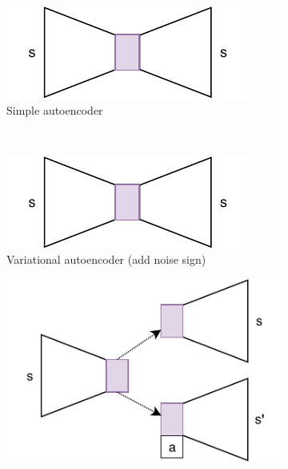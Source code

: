 \begin{figure}[ht!]
	\centering
	\begin{subfigure}{0.45\columnwidth}
		\centering
		\includegraphics[width=\linewidth]{img/very_simple_autoencoder.pdf}
		\caption{Simple autoencoder}
		\label{subfig:repr_learner_simple_autoencoder}
	\end{subfigure}%
	~ 
	\begin{subfigure}{0.45\columnwidth}
		\centering
		\includegraphics[width=\linewidth]{img/very_simple_autoencoder.pdf}
		\caption{Variational autoencoder (add noise sign)}
		\label{subfig:repr_learner_vae}
	\end{subfigure}
	\begin{subfigure}{0.5\columnwidth}
		\centering
		\includegraphics[width=\linewidth]{img/janus.pdf}

\end{subfigure}
\end{figure}
